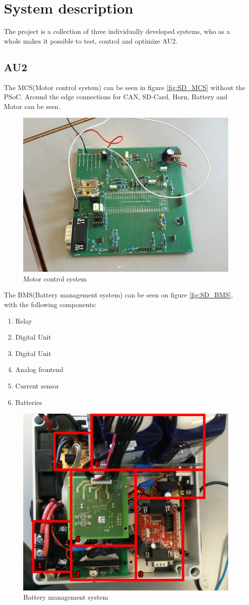 \chapter{System description}
The project is a collection of three individually developed systems, who as a whole makes it possible to test, control and optimize AU2.

\section{AU2}
The MCS(Motor control system) can be seen in figure \vref{fig:SD_MCS} without the PSoC. Around the edge connections  for CAN, SD-Card, Horn, Battery and Motor can be seen.

\begin{figure}[H]
	\centering
	\includegraphics[width=0.6\linewidth]{SubPages/Images/SD_MCS}
	\caption{Motor control system}
	\label{fig:SD_MCS}
\end{figure}

The BMS(Battery management system) can be seen on figure \vref{fig:SD_BMS}, with the following components:

\begin{enumerate}
	\item Relay
	\item Digital Unit
	\item Digital Unit
	\item Analog frontend
	\item Current sensor
	\item Batteries
\end{enumerate}

\begin{figure}[H]
	\centering
	\includegraphics[width=0.7\linewidth]{SubPages/Images/SD_BMS}
	\caption{Battery management system}
	\label{fig:SD_BMS}
\end{figure}

